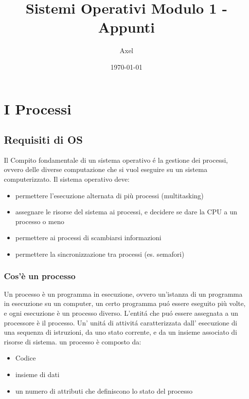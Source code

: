\documentclass[11pt]{article}
\begin{document}
\title{Sistemi Operativi Modulo 1 - Appunti}
\author{Axel}
\date{\today}
\maketitle

\tableofcontents
\newpage

\section{I Processi}
\subsection{Requisiti di OS}
Il  Compito fondamentale di un sistema operativo é la gestione dei processi, ovvero delle diverse computazione che si vuol
eseguire su un sistema computerizzato. Il sistema operativo deve:
\begin{itemize}
    \item permettere l'esecuzione alternata di più processi (multitasking)
    \item assegnare le risorse del sistema ai processi, e decidere se dare la CPU a un processo o meno
    \item permettere ai processi di scambiarsi informazioni
    \item permettere la sincronizzazione tra processi (es. semafori)
\end{itemize}
\subsubsection{Cos'è un processo}
Un processo è un programma in esecuzione, ovvero un'istanza di un programma in esecuzione su un computer, un certo programma
puó essere eseguito più volte, e ogni esecuzione è un processo diverso.
L'entitá che puó essere assegnata a un processore è il processo.
Un' unitá di attivitá caratterizzata dall' esecuzione di una sequenza di istruzioni, da uno stato corrente, e da un insieme
associato di risorse di sistema.
un processo è composto da:
\begin{itemize}
    \item Codice
    \item insieme di dati
    \item un numero di attributi che definiscono lo stato del processo
    \end{itemize}
\end{document}
